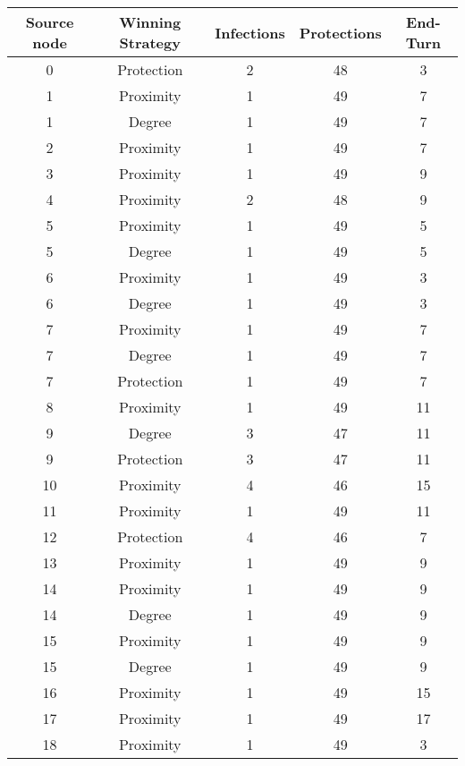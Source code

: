 \documentclass[results.tex]{subfiles}
\begin{document}
\begin{center}
  \begin{tabular}{| c || c | c | c | c |}
    \hline
    {\bfseries Source node} & {\bfseries Winning Strategy} & {\bfseries Infections} & {\bfseries Protections} & {\bfseries End-Turn} \\  %
    \hline\hline
    0 & Protection & 2 & 48 & 3 \\ 
    \hline
    1 & Proximity & 1 & 49 & 7 \\ 
    \hline
    1 & Degree & 1 & 49 & 7 \\ 
    \hline
    2 & Proximity & 1 & 49 & 7 \\ 
    \hline
    3 & Proximity & 1 & 49 & 9 \\ 
    \hline
    4 & Proximity & 2 & 48 & 9 \\ 
    \hline
    5 & Proximity & 1 & 49 & 5 \\ 
    \hline
    5 & Degree & 1 & 49 & 5 \\ 
    \hline
    6 & Proximity & 1 & 49 & 3 \\ 
    \hline
    6 & Degree & 1 & 49 & 3 \\ 
    \hline
    7 & Proximity & 1 & 49 & 7 \\ 
    \hline
    7 & Degree & 1 & 49 & 7 \\ 
    \hline
    7 & Protection & 1 & 49 & 7 \\ 
    \hline
    8 & Proximity & 1 & 49 & 11 \\ 
    \hline
    9 & Degree & 3 & 47 & 11 \\ 
    \hline
    9 & Protection & 3 & 47 & 11 \\ 
    \hline
    10 & Proximity & 4 & 46 & 15 \\ 
    \hline
    11 & Proximity & 1 & 49 & 11 \\ 
    \hline
    12 & Protection & 4 & 46 & 7 \\ 
    \hline
    13 & Proximity & 1 & 49 & 9 \\ 
    \hline
    14 & Proximity & 1 & 49 & 9 \\ 
    \hline
    14 & Degree & 1 & 49 & 9 \\ 
    \hline
    15 & Proximity & 1 & 49 & 9 \\ 
    \hline
    15 & Degree & 1 & 49 & 9 \\ 
    \hline
    16 & Proximity & 1 & 49 & 15 \\ 
    \hline
    17 & Proximity & 1 & 49 & 17 \\ 
    \hline
    18 & Proximity & 1 & 49 & 3 \\ 

\end{tabular}
\end{center}
\end{document}
